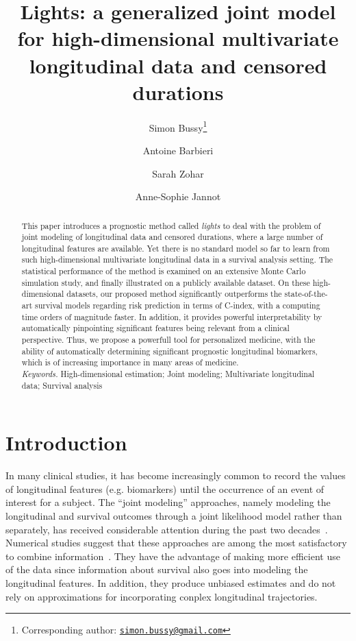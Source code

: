 \documentclass[11pt]{article}
\title{\vspace{-.5cm} Lights: a generalized joint model for high-dimensional multivariate longitudinal data and censored durations \vspace{.5cm}}
\author[1]{Simon Bussy\thanks{Corresponding author: \href{mailto:simon.bussy@gmail.com}{\texttt{simon.bussy@gmail.com}}}}
\author[2]{Antoine Barbieri}
\author[1]{Sarah Zohar}
\author[1,3]{Anne-Sophie Jannot}
\affil[1]{INSERM, UMRS 1138, Centre de Recherche des Cordeliers, Paris, France}
\affil[2]{INSERM, UMR 1219, Bordeaux Population Health Research Center, Univ. Bordeaux, France}
\affil[3]{Biomedical Informatics and Public Health Department, EGPH, APHP, Paris, France}
\date{}
\begin{document}
\maketitle

\vspace{-.5cm}

\begin{abstract}

This paper introduces a prognostic method called \textit{lights} to deal with the problem of joint modeling of longitudinal data and censored durations, where a large number of longitudinal features are available. Yet there is no standard model so far to learn from such high-dimensional multivariate longitudinal data in a survival analysis setting.
The statistical performance of the method is examined on an extensive Monte Carlo simulation study, and finally illustrated on a publicly available dataset.
On these high-dimensional datasets, our proposed method significantly outperforms the state-of-the-art survival models regarding risk prediction in terms of C-index, with a computing time orders of magnitude faster. In addition, it provides powerful interpretability by automatically pinpointing significant features being relevant from a clinical perspective. Thus, we propose a powerfull tool for personalized medicine, with the ability of automatically determining significant prognostic longitudinal biomarkers, which is of increasing importance in many areas of medicine.
\\

\noindent
\emph{Keywords.} High-dimensional estimation; Joint modeling; Multivariate longitudinal data; Survival analysis
\end{abstract}

\section{Introduction}

In many clinical studies, it has become increasingly common to record the values of longitudinal features (e.g. biomarkers) until the occurrence of an event of interest for a subject. The ``joint modeling'' approaches, namely modeling the longitudinal and survival outcomes through a joint likelihood model rather than separately, has received considerable attention during the past two decades~\citep{wulfsohn1997joint}. Numerical studies suggest that these approaches are among the most satisfactory to combine information~\citep{tsiatis2004joint,yu2004joint}. They have the advantage of making more efficient use of the data since information about survival also goes into modeling the longitudinal features. In addition, they produce unbiased estimates and do not rely on approximations for incorporating conplex longitudinal trajectories.
\end{document}
